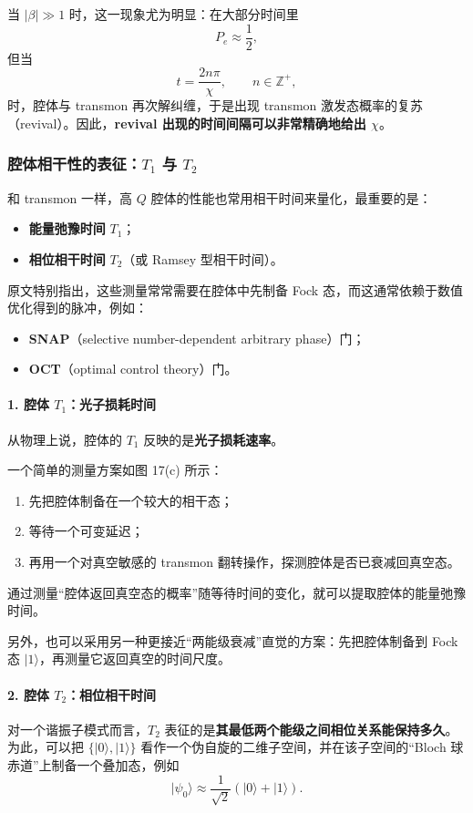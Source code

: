 \documentclass[12pt,a4paper,oneside]{ctexbook}
\begin{document}
当 \(|\beta|\gg 1\) 时，这一现象尤为明显：在大部分时间里
\[
P_e \approx \frac{1}{2},
\]
但当
\[
t=\frac{2n\pi}{\chi},\qquad n\in \mathbb{Z}^+,
\]
时，腔体与 transmon 再次解纠缠，于是出现 transmon 激发态概率的复苏（revival）。因此，\textbf{revival 出现的时间间隔可以非常精确地给出 \(\chi\)}。

\subsubsection{腔体相干性的表征：\(T_1\) 与 \(T_2\)}

和 transmon 一样，高 \(Q\) 腔体的性能也常用相干时间来量化，最重要的是：
\begin{itemize}
    \item \textbf{能量弛豫时间} \(T_1\)；
    \item \textbf{相位相干时间} \(T_2\)（或 Ramsey 型相干时间）。
\end{itemize}

原文特别指出，这些测量常常需要在腔体中先制备 Fock 态，而这通常依赖于数值优化得到的脉冲，例如：
\begin{itemize}
    \item \textbf{SNAP}（selective number-dependent arbitrary phase）门；
    \item \textbf{OCT}（optimal control theory）门。
\end{itemize}

\paragraph{1. 腔体 \(T_1\)：光子损耗时间}
从物理上说，腔体的 \(T_1\) 反映的是\textbf{光子损耗速率}。

一个简单的测量方案如图 17(c) 所示：
\begin{enumerate}
    \item 先把腔体制备在一个较大的相干态；
    \item 等待一个可变延迟；
    \item 再用一个对真空敏感的 transmon 翻转操作，探测腔体是否已衰减回真空态。
\end{enumerate}

通过测量“腔体返回真空态的概率”随等待时间的变化，就可以提取腔体的能量弛豫时间。

另外，也可以采用另一种更接近“两能级衰减”直觉的方案：先把腔体制备到 Fock 态 \(|1\rangle\)，再测量它返回真空的时间尺度。

\paragraph{2. 腔体 \(T_2\)：相位相干时间}
对一个谐振子模式而言，\(T_2\) 表征的是\textbf{其最低两个能级之间相位关系能保持多久}。为此，可以把 \(\{|0\rangle,|1\rangle\}\) 看作一个伪自旋的二维子空间，并在该子空间的“Bloch 球赤道”上制备一个叠加态，例如
\begin{equation}
|\psi_0\rangle
\approx
\frac{1}{\sqrt2}\left(|0\rangle+|1\rangle\right).
\tag{88}
\end{equation}
\end{document}
